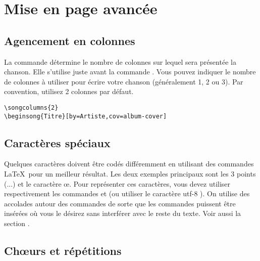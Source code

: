 \documentclass[versionenligne]{framabook}
\begin{document}
\section{Mise en page avancée}

\subsection{Agencement en colonnes}

La commande  détermine le nombre de colonnes sur
lequel sera présentée la chanson. Elle s'utilise juste avant la
commande . Vous pouvez indiquer le nombre de colonnes
à utiliser pour écrire votre chanson (généralement 1, 2 ou 3). Par
convention, utilisez 2 colonnes par défaut.

\begin{verbatim}
\songcolumns{2}
\beginsong{Titre}[by=Artiste,cov=album-cover]
\end{verbatim}

\subsection{Caractères spéciaux}

Quelques caractères doivent être codés différemment en utilisant des
commandes \LaTeX\, pour un meilleur résultat. Les deux exemples
principaux sont les 3 points (...) et le caractère \oe{}. Pour
représenter ces caractères, vous devez utiliser respectivement les
commandes  et  (ou utiliser le
caractère utf-8 ). On utilise des accolades autour des commandes de
sorte que les commandes puissent être insérées où vous le désirez sans
interférer avec le reste du texte. Voir aussi
la section .

\subsection{Ch\oe{}urs et répétitions}
\end{document}
